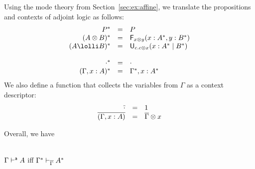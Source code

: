 Using the mode theory from Section~\ref{sec:ex:affine}, we translate the
propositions and contexts of adjoint logic as follows:
\[
\begin{array}{rcl}
P^* & = & P \\
(A\otimes B)^* & = & \F{x \otimes y}{x:A^*,y:B^*} \\
(A\lolli B)^* & = & \U{c.c \otimes x}{x:A^*}{B^*} \\
\\
\cdot^* & = & \cdot\\
(\Gamma,x:A)^* & = & \Gamma^*,x:A^*\\
\end{array}
\]
We also define a function that collects the variables from $\Gamma$ as a
context descriptor:
\[
\begin{array}{rcl}
\overline{\cdot} & = & 1\\
\overline{(\Gamma,x:A)} & = & \overline{\Gamma} \otimes x\\
\end{array}
\]

Overall, we have
\begin{theorem} ~\\
$\Gamma \vdash^{\mathsf{a}} A$ iff $\Gamma^* \vdash_{\overline{\Gamma}} A^*$
\end{theorem}

